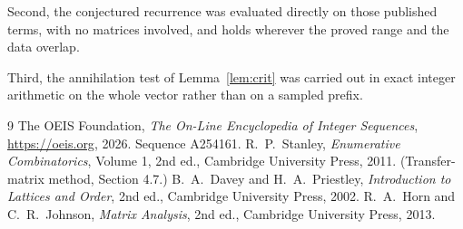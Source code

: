 \documentclass[11pt,a4paper]{article}
\theoremstyle{plain}
\theoremstyle{definition}
\begin{document}
Second, the conjectured recurrence was evaluated directly on those published terms, with no
matrices involved, and holds wherever the proved range and the data overlap.

Third, the annihilation test of Lemma~\ref{lem:crit} was carried out in exact integer
arithmetic on the whole vector rather than on a sampled prefix.

\begin{thebibliography}{9}
 The OEIS Foundation, \emph{The On-Line Encyclopedia of Integer
Sequences}, \url{https://oeis.org}, 2026. Sequence A254161.
 R.~P.~Stanley, \emph{Enumerative Combinatorics}, Volume 1, 2nd ed.,
Cambridge University Press, 2011. (Transfer-matrix method, Section 4.7.)
 B.~A.~Davey and H.~A.~Priestley, \emph{Introduction to Lattices and
Order}, 2nd ed., Cambridge University Press, 2002.
 R.~A.~Horn and C.~R.~Johnson, \emph{Matrix Analysis}, 2nd ed., Cambridge
University Press, 2013.
\end{thebibliography}
\end{document}
